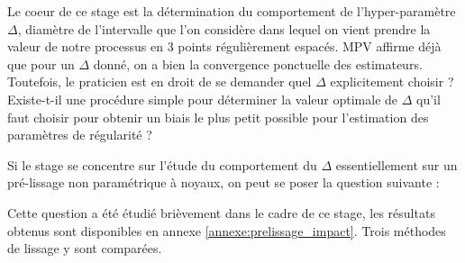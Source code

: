 \bigskip

Le coeur de ce stage est la détermination du comportement de l'hyper-paramètre $\Delta$, diamètre de l'intervalle que l'on considère dans lequel on vient prendre la valeur de notre processus en 3 points régulièrement espacés. MPV affirme déjà que pour un $\Delta$ donné, on a bien la convergence ponctuelle des estimateurs. \cite{maissoro-SmoothnessFTSweakDep}
Toutefois, le praticien est en droit de se demander quel $\Delta$ explicitement choisir ? Existe-t-il une procédure simple pour déterminer la valeur optimale de $\Delta$ qu'il faut choisir pour obtenir un biais le plus petit possible pour l'estimation des paramètres de régularité ?

\begin{rem}
{
Si le stage se concentre sur l'étude du comportement du $\Delta$ essentiellement sur un pré-lissage non paramétrique à noyaux, on peut se poser la question suivante :


Cette question a été étudié brièvement dans le cadre de ce stage, les résultats obtenus sont disponibles en annexe \ref{annexe:prelissage_impact}. Trois méthodes de lissage y sont comparées.
}
\end{rem}